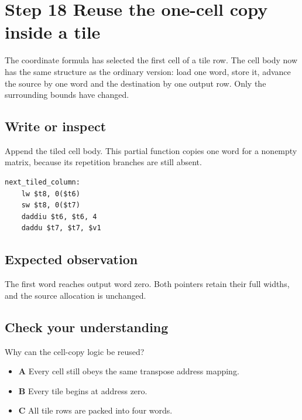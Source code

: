 \section{Step 18 Reuse the one-cell copy inside a tile}\label{transpose-s18}

The coordinate formula has selected the first cell of a tile row. The cell body now has the same structure as the ordinary version: load one word, store it, advance the source by one word and the destination by one output row. Only the surrounding bounds have changed.

\subsection{Write or inspect}
Append the tiled cell body. This partial function copies one word for a nonempty matrix, because its repetition branches are still absent.

\begin{verbatim}
next_tiled_column:
    lw $t8, 0($t6)
    sw $t8, 0($t7)
    daddiu $t6, $t6, 4
    daddu $t7, $t7, $v1
\end{verbatim}

\subsection{Expected observation}
The first word reaches output word zero. Both pointers retain their full widths, and the source allocation is unchanged.

\subsection{Check your understanding}
Why can the cell-copy logic be reused?

\begin{itemize}
  \item \textbf{A} Every cell still obeys the same transpose address mapping.
  \item \textbf{B} Every tile begins at address zero.
  \item \textbf{C} All tile rows are packed into four words.
\end{itemize}

